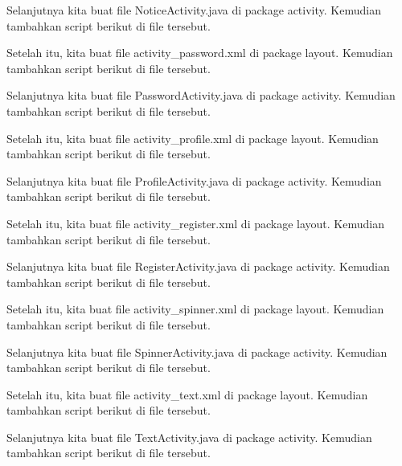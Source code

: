Selanjutnya kita buat file NoticeActivity.java di package activity. Kemudian tambahkan script berikut di file tersebut.


Setelah itu, kita buat file activity\_password.xml di package layout. Kemudian tambahkan script berikut di file tersebut.


Selanjutnya kita buat file PasswordActivity.java di package activity. Kemudian tambahkan script berikut di file tersebut.


Setelah itu, kita buat file activity\_profile.xml di package layout. Kemudian tambahkan script berikut di file tersebut.


Selanjutnya kita buat file ProfileActivity.java di package activity. Kemudian tambahkan script berikut di file tersebut.


Setelah itu, kita buat file activity\_register.xml di package layout. Kemudian tambahkan script berikut di file tersebut.


Selanjutnya kita buat file RegisterActivity.java di package activity. Kemudian tambahkan script berikut di file tersebut.


Setelah itu, kita buat file activity\_spinner.xml di package layout. Kemudian tambahkan script berikut di file tersebut.


Selanjutnya kita buat file SpinnerActivity.java di package activity. Kemudian tambahkan script berikut di file tersebut.


Setelah itu, kita buat file activity\_text.xml di package layout. Kemudian tambahkan script berikut di file tersebut.


Selanjutnya kita buat file TextActivity.java di package activity. Kemudian tambahkan script berikut di file tersebut.


